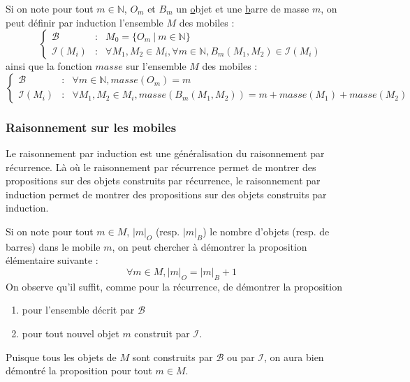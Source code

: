 \documentclass[../../main.tex]{subfiles}
\begin{document}
Si on note pour tout $m\in\mathbb{N}$, $O_m$ et $B_m$ un \underline{o}bjet et une \underline{b}arre de masse $m$, on peut définir par induction l'ensemble $M$ des mobiles :
$$\left\{\begin{array}{cll}
	\mathcal{B} & : & M_0 = \{O_m\ |\ m\in\mathbb{N}\} \\
	\mathcal{I}(M_i) & : & \forall{M_1, M_2\in{M_i}}, \forall m\in \mathbb{N}, B_m(M_1, M_2)\in \mathcal{I}(M_i)
\end{array}\right.$$
ainsi que la fonction $masse$ sur l'ensemble $M$ des mobiles :
$$\left\{\begin{array}{cll}
	\mathcal{B} & : & \forall m\in\mathbb{N}, masse(O_m) = m \\
	\mathcal{I}(M_i) & : & \forall{M_1, M_2\in{M_i}}, masse(B_m(M_1, M_2)) = m + masse(M_1) + masse(M_2)
\end{array}\right.$$
\subsubsection{Raisonnement sur les mobiles}
Le raisonnement par induction est une généralisation du raisonnement par récurrence. Là où le raisonnement par récurrence permet de montrer des propositions sur des objets construits par récurrence, le raisonnement par induction permet de montrer des propositions sur des objets construits par induction.

Si on note pour tout $m\in M$, $|m|_O$ (resp. $|m|_B$) le nombre d'objets (resp. de barres) dans le mobile $m$, on peut chercher à démontrer la proposition élémentaire suivante : 
$$\forall m\in M, |m|_O = |m|_B + 1$$
On observe qu'il suffit, comme pour la récurrence, de démontrer la proposition 
\begin{enumerate}
	\item pour l'ensemble décrit par $\mathcal{B}$
	\item pour tout nouvel objet $m$ construit par $\mathcal{I}$.
\end{enumerate}
Puisque tous les objets de $M$ sont construits par $\mathcal{B}$ ou par $\mathcal{I}$, on aura bien démontré la proposition pour tout $m\in M$.
\end{document}
